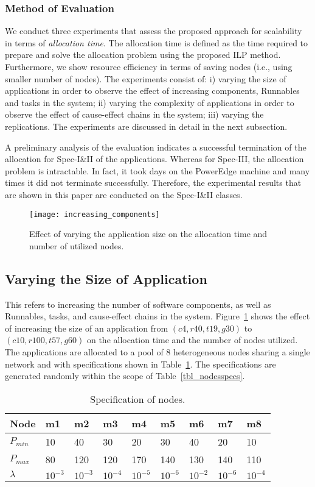 \subsubsection{Method of Evaluation}
We conduct three experiments that assess the proposed approach for scalability in terms of \textit{allocation time}. The allocation time is defined as the time required to prepare and solve the allocation problem using the proposed ILP method. Furthermore, we show resource efficiency in terms of saving nodes (i.e., using smaller number of nodes). The experiments consist of: i) varying the size of applications in order to observe the effect of increasing components, Runnables and tasks in the system; ii) varying the complexity of applications in order to observe the effect of cause-effect chains in the system; iii) varying the replications. The experiments are discussed in detail in the next subsection.

A preliminary analysis of the evaluation indicates a successful termination of the allocation for Spec-I\&II of the applications. Whereas for Spec-III, the allocation problem is intractable. In fact, it took days on the PowerEdge machine and many times it did not terminate successfully. Therefore, the experimental results that are shown in this paper are conducted on the Spec-I\&II classes. 
\begin{figure}[t!]
\centering
\texttt{[image: increasing\_components]}
\caption{Effect of varying the application size on the allocation time and number of utilized nodes.}
\label{fig_increasing_components}
\end{figure}
\subsection{Varying the Size of Application} 
This refers to increasing the number of software components, as well as Runnables, tasks, and cause-effect chains in the system. Figure~\ref{fig_increasing_components} shows the effect of increasing the size of an application from $(c4,r40,t19,g30)$ to $(c10,r100,t57,g60)$ on the allocation time and  the number of nodes utilized. The applications are allocated to a pool of 8 heterogeneous nodes sharing a single network and with specifications shown in Table~\ref{tbl_nodesspecs_exp}. The specifications are generated randomly within the scope of Table~\ref{tbl_nodesspecs}.
\begin{table}
\centering\small
\setlength{\tabcolsep}{4pt}
\begin{tabular}{@{}lllllllll@{}}
\toprule
Node  		& m1 & m2 & m3 & m4&m5&m6&m7&m8\\ 
\midrule
$P_{min}$ & 10 	& 40 	&	30 	&	20 	& 30 	& 	40	&	20&	10\\
$P_{max}$ & 80	& 120	&	120	&	170	&	140	&	130	&	140 &110\\
$\lambda$  &$10^{-3}$	&$10^{-3}$	&$10^{-4}$&$10^{-5}$&$10^{-6}$&$10^{-2}$&$10^{-6}$&$10^{-4}$\\
\bottomrule
\end{tabular}
\caption{Specification of nodes.}
\label{tbl_nodesspecs_exp}
\end{table}

